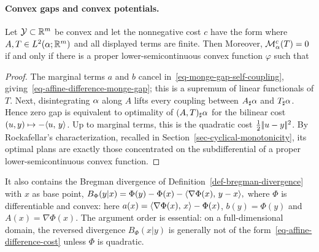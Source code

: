 \paragraph{Convex gaps and convex potentials.}
\begin{prop}\label{prop-affine-difference-monge-gap}
Let $\mathcal{Y}\subset\mathbb{R}^m$ be convex and let the nonnegative cost $c$ have the form
where $A,T\in L^2(\alpha;\mathbb{R}^m)$ and all displayed terms are finite. Then
Moreover, $\mathcal M_\alpha^c(T)=0$ if and only if there is a proper lower-semicontinuous convex function $\varphi$ such that
\end{prop}
\begin{proof}
The marginal terms $a$ and $b$ cancel in~\eqref{eq-monge-gap-self-coupling}, giving~\eqref{eq-affine-difference-monge-gap}; this is a supremum of linear functionals of $T$. Next, disintegrating $\alpha$ along $A$ lifts every coupling between $A_\sharp\alpha$ and $T_\sharp\alpha$. Hence zero gap is equivalent to optimality of $(A,T)_\sharp\alpha$ for the bilinear cost $(u,y)\mapsto-\langle u,\,y\rangle$. Up to marginal terms, this is the quadratic cost $\frac12|\!| u-y |\!|^2$. By Rockafellar's characterization, recalled in Section~\ref{sec-cyclical-monotonicity}, its optimal plans are exactly those concentrated on the subdifferential of a proper lower-semicontinuous convex function.
\end{proof}
It also contains the Bregman divergence of Definition~\ref{def-bregman-divergence} with $x$ as base point, \(B_\Phi(y|x)=\Phi(y)-\Phi(x)-\langle \nabla\Phi(x),\,y-x\rangle,\)
where $\Phi$ is differentiable and convex: here $a(x)=\langle \nabla\Phi(x),\,x\rangle-\Phi(x)$, $b(y)=\Phi(y)$ and $A(x)=\nabla\Phi(x)$. The argument order is essential: on a full-dimensional domain, the reversed divergence $B_\Phi(x|y)$ is generally not of the form~\eqref{eq-affine-difference-cost} unless $\Phi$ is quadratic.

